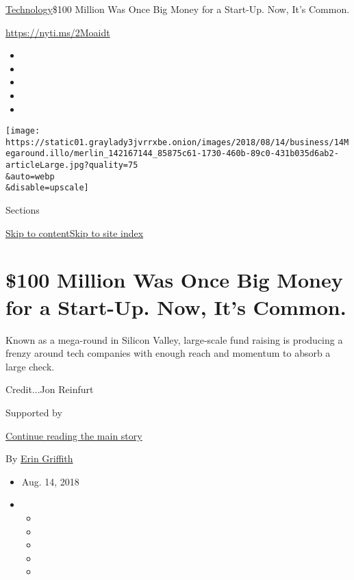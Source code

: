 \href{/section/technology}{Technology}\textbar{}\$100 Million Was Once
Big Money for a Start-Up. Now, It's Common.

\url{https://nyti.ms/2Moaidt}

\begin{itemize}
\item
\item
\item
\item
\item
\end{itemize}

\texttt{[image: https://static01.graylady3jvrrxbe.onion/images/2018/08/14/business/14Megaround.illo/merlin\_142167144\_85875c61-1730-460b-89c0-431b035d6ab2-articleLarge.jpg?quality=75\\\&auto=webp\\\&disable=upscale]}

Sections

\protect\hyperlink{site-content}{Skip to
content}\protect\hyperlink{site-index}{Skip to site index}

\hypertarget{100-million-was-once-big-money-for-a-start-up-now-its-common}{%
\section{\$100 Million Was Once Big Money for a Start-Up. Now, It's
Common.}\label{100-million-was-once-big-money-for-a-start-up-now-its-common}}

Known as a mega-round in Silicon Valley, large-scale fund raising is
producing a frenzy around tech companies with enough reach and momentum
to absorb a large check.

Credit...Jon Reinfurt

Supported by

\protect\hyperlink{after-sponsor}{Continue reading the main story}

By \href{https://www.nytimes3xbfgragh.onion/by/erin-griffith}{Erin
Griffith}

\begin{itemize}
\item
  Aug. 14, 2018
\item
  \begin{itemize}
  \item
  \item
  \item
  \item
  \item
  \end{itemize}
\end{itemize}

